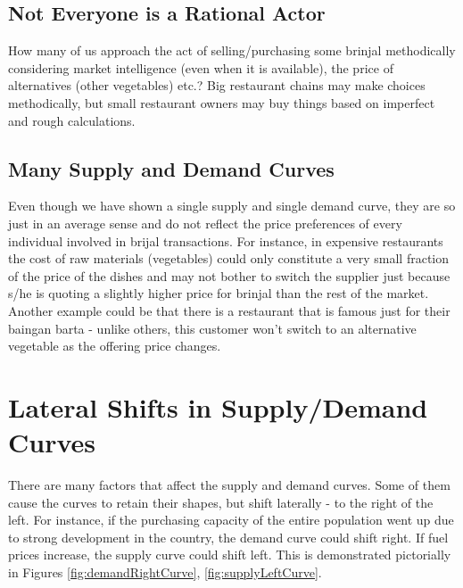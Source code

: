 \subsection{Not Everyone is a Rational Actor}
How many of us approach the act of selling/purchasing some brinjal methodically considering market intelligence (even when it is available), the price of alternatives (other vegetables) etc.? Big restaurant chains may make choices methodically, but small restaurant owners may buy things based on imperfect and rough calculations.

\subsection{Many Supply and Demand Curves}
Even though we have shown a single supply and single demand curve, they are so just in an average sense and do not reflect the price preferences of every individual involved in brijal transactions. For instance, in expensive restaurants the cost of raw materials (vegetables) could only constitute a very small fraction of the price of the dishes and may not bother to switch the supplier just because s/he is quoting a slightly higher price for brinjal than the rest of the market. Another example could be that there is a restaurant that is famous just for their baingan barta - unlike others, this customer won't switch to an alternative vegetable as the offering price changes.

\section{Lateral Shifts in Supply/Demand Curves}
There are many factors that affect the supply and demand curves. Some of them cause the curves to retain their shapes, but shift laterally - to the right of the left. For instance, if the purchasing capacity of the entire population went up due to strong development in the country, the demand curve could shift right. If fuel prices increase, the supply curve could shift left. This is demonstrated pictorially in Figures \autoref{fig:demandRightCurve}, \autoref{fig:supplyLeftCurve}.

